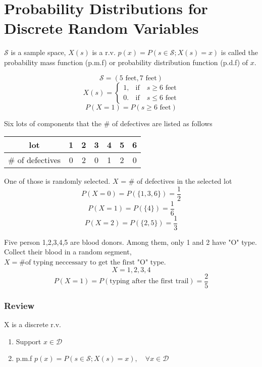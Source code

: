 \section{Probability Distributions for Discrete Random Variables}

\begin{defn}

$\mathcal{S}$ is a sample space, $X(s)$ is a r.v. $p(x)=P(s\in \mathcal{S};X(s)= x) $ is called the probability mass function (p.m.f) or probability distribution function (p.d.f) of $x$.
\end{defn}

\begin{exmp}
\[	\mathcal{S}=(5 \text{ feet}, 7 \text{ feet} )		\]
\[	X(s)=\begin{cases}
1, & \text{if} \quad s\geq 6 \text{ feet} \\
0. & \text{if} \quad s\leq 6 \text{ feet}
\end{cases}		\]
\[	P(X=1)=P(s \geq 6 \text{ feet})\]
\end{exmp}

\begin{exmp}
Six lots of components that the \# of defectives are listed as follows
\begin{center}
\begin{tabular}{c|cccccc}
\hline
lot				& 1 & 2 & 3 & 4 & 5 & 6 \\
\hline
\# of defectives& 0 & 2 & 0 & 1 & 2 & 0 \\
\hline
\end{tabular}
\end{center}

One of those is randomly selected. $X$ = \# of defectives in the selected lot
\[	P(X=0)=P(\{1,3,6\})=\frac{1}{2}		\]
\[	P(X=1)=P(\{4\})=\frac{1}{6}			\]
\[	P(X=2)=P(\{2,5\})=\frac{1}{3}		\]
\end{exmp}

\begin{exmp}
Five person 1,2,3,4,5 are blood donors. Among them, only 1 and 2 have "O" type. Collect their blood in a random segment, $X=\text{\# of typing neccessary to get the first "O" type}$.
\[	X = 1,2,3,4		\]
\[	P(X=1)=P(\text{typing after the first trail})=\frac{2}{5} \]
\end{exmp}

\subsubsection{Review}
X is a discrete r.v.
\begin{enumerate}
\item Support $x \in \mathcal{D}$
\item p.m.f $p(x)=P(s\in \mathcal{S};X(s)= x), \quad\forall x \in \mathcal{D}$
\end{enumerate}


